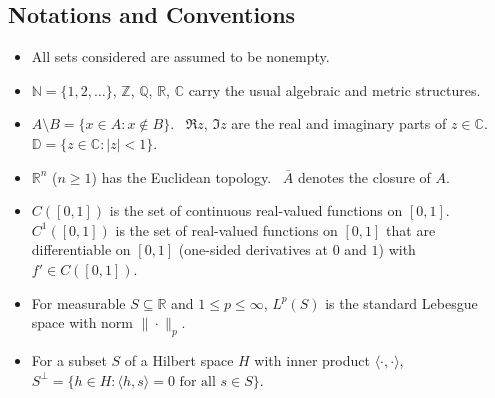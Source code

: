 \documentclass[11pt, a4paper]{article}
\begin{document}
\subsection*{Notations and Conventions}
\begin{itemize}
\item All sets considered are assumed to be nonempty.
\item $\mathbb{N}=\{1,2,\ldots\}$, $\mathbb{Z}$, $\mathbb{Q}$, $\mathbb{R}$, $\mathbb{C}$ carry the usual algebraic and metric structures.
\item $A\setminus B=\{x\in A: x\notin B\}$. \ $\Re z$, $\Im z$ are the real and imaginary parts of $z\in\mathbb{C}$. \ $\mathbb{D}=\{z\in\mathbb{C}:|z|<1\}$.
\item $\mathbb{R}^n$ ($n\ge1$) has the Euclidean topology. \ $\overline A$ denotes the closure of $A$.
\item $C([0,1])$ is the set of continuous real-valued functions on $[0,1]$. $C^1([0,1])$ is the set of real-valued functions on $[0,1]$ that are differentiable on $[0,1]$ (one-sided derivatives at $0$ and $1$) with $f'\in C([0,1])$.
\item For measurable $S\subseteq\mathbb{R}$ and $1\le p\le\infty$, $L^p(S)$ is the standard Lebesgue space with norm $\|\cdot\|_p$.
\item For a subset $S$ of a Hilbert space $H$ with inner product $\langle\cdot,\cdot\rangle$, $S^\perp=\{h\in H:\langle h,s\rangle=0 \text{ for all } s\in S\}$.
\end{itemize}
\end{document}
